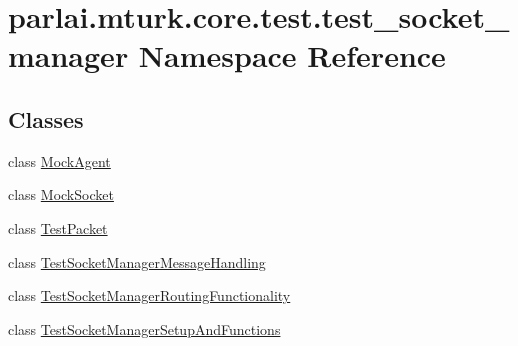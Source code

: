 \hypertarget{namespaceparlai_1_1mturk_1_1core_1_1test_1_1test__socket__manager}{}\section{parlai.\+mturk.\+core.\+test.\+test\+\_\+socket\+\_\+manager Namespace Reference}
\label{namespaceparlai_1_1mturk_1_1core_1_1test_1_1test__socket__manager}
\subsection*{Classes}
\begin{DoxyCompactItemize}
\item 
class \hyperlink{classparlai_1_1mturk_1_1core_1_1test_1_1test__socket__manager_1_1MockAgent}{Mock\+Agent}
\item 
class \hyperlink{classparlai_1_1mturk_1_1core_1_1test_1_1test__socket__manager_1_1MockSocket}{Mock\+Socket}
\item 
class \hyperlink{classparlai_1_1mturk_1_1core_1_1test_1_1test__socket__manager_1_1TestPacket}{Test\+Packet}
\item 
class \hyperlink{classparlai_1_1mturk_1_1core_1_1test_1_1test__socket__manager_1_1TestSocketManagerMessageHandling}{Test\+Socket\+Manager\+Message\+Handling}
\item 
class \hyperlink{classparlai_1_1mturk_1_1core_1_1test_1_1test__socket__manager_1_1TestSocketManagerRoutingFunctionality}{Test\+Socket\+Manager\+Routing\+Functionality}
\item 
class \hyperlink{classparlai_1_1mturk_1_1core_1_1test_1_1test__socket__manager_1_1TestSocketManagerSetupAndFunctions}{Test\+Socket\+Manager\+Setup\+And\+Functions}
\end{DoxyCompactItemize}
